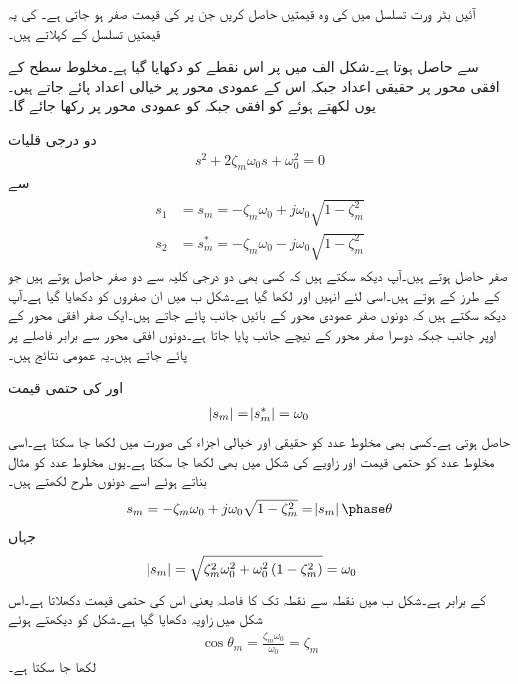 آئیں بٹر ورت تسلسل میں  کی وہ قیمتیں حاصل کریں جن پر  کی قیمت صفر ہو جاتی  ہے۔ کی یہ قیمتیں تسلسل کے  کہلاتے ہیں۔

 سے  حاصل ہوتا ہے۔شکل  الف میں  پر اس نقطے کو دکھایا گیا ہے۔مخلوط سطح کے افقی محور پر حقیقی اعداد جبکہ اس کے عمودی محور پر خیالی اعداد پائے جاتے ہیں۔یوں  لکھتے ہوئے  کو افقی جبکہ  کو عمودی محور پر رکھا جائے گا۔

دو درجی قلیات
\begin{align}\label{مساوات_تعددی_ردعمل_دو_درجی_عمومی_جزو}
s^2+2 \zeta_m \omega_0 s +\omega_0^2=0
\end{align}
سے
\begin{gather}
\begin{aligned}
s_1&=s_m =-\zeta_m \omega_0 + j \omega_0 \sqrt{1-\zeta_m^2}\\
s_2&=s_m^* =-\zeta_m \omega_0 - j \omega_0 \sqrt{1-\zeta_m^2}
\end{aligned}
\end{gather}
صفر حاصل ہوتے ہیں۔آپ دیکھ سکتے ہیں کہ کسی بھی دو درجی کلیہ سے دو صفر حاصل ہوتے ہیں جو  کے طرز کے ہوتے ہیں۔اسی لئے انہیں  اور  لکھا گیا ہے۔شکل  ب میں ان صفروں کو دکھایا گیا ہے۔آپ دیکھ سکتے ہیں کہ دونوں صفر عمودی محور کے بائیں جانب پائے جاتے ہیں۔ایک صفر افقی محور کے اوپر جانب جبکہ دوسرا صفر محور کے نیچے   جانب پایا جاتا ہے۔دونوں افقی محور سے برابر فاصلے پر پائے جاتے ہیں۔یہ  عمومی نتائج ہیں۔

 اور  کی حتمی قیمت
\begin{align}
\abs{s_m}=\abs{s_m^*}=\omega_0
\end{align}
حاصل ہوتی ہے۔کسی بھی مخلوط عدد کو حقیقی اور خیالی اجزاء کی صورت میں لکھا جا سکتا ہے۔اسی مخلوط عدد کو حتمی قیمت اور زاویے کی شکل میں بھی لکھا جا سکتا ہے۔یوں  مخلوط عدد کو مثال بناتے ہوئے اسے دونوں طرح لکھتے ہیں۔
\begin{align}
s_m=-\zeta_m \omega_0 +j \omega_0 \sqrt{1-\zeta_m^2}= \abs {s_m} \phase \theta
\end{align}
جہاں
\begin{align}\label{مساوات_تعددی_ردعمل_صفر_حتمی_فاصلہ}
\abs{s_m}&=\sqrt{\zeta_m^2 \omega_0^2 +\omega_0^2\left(1 -\zeta_m^2\right)}=\omega_0
\end{align}
کے برابر ہے۔شکل  ب میں نقطہ   سے  نقطہ  تک کا فاصلہ  یعنی اس کی حتمی قیمت دکھلاتا ہے۔اس شکل میں زاویہ  دکھایا گیا ہے۔شکل کو دیکھتے ہوئے
\begin{align}\label{مساوات_تعددی_ردعمل_دھیماپن_کا_حصول}
\cos \theta_m=\frac{\zeta_m \omega_0}{\omega_0}=\zeta_m
\end{align}
لکھا جا سکتا ہے۔

